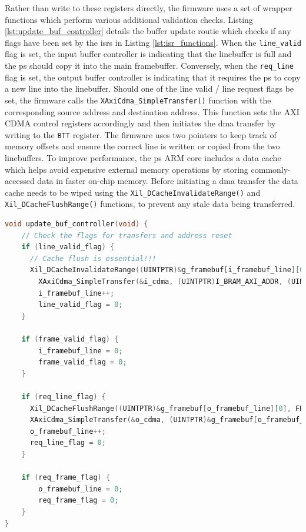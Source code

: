 Rather than write to these registers directly, the firmware uses a set of wrapper functions which perform various additional validation checks. Listing \ref{lst:update_buf_controller} details the buffer update routie which checks if any flags have been set by the \glspl{isr} in Listing \ref{lst:isr_functions}. When the \texttt{line\_valid} flag is set, the input buffer controller is indicating that the linebuffer is full and the \gls{ps} should copy it into the main framebuffer. Conversely, when the \texttt{req\_line} flag is set, the output buffer controller is indicating that it requires the \gls{ps} to copy a new line into the linebuffer. Should one of the line valid / line request flags be set, the firmware calls the \texttt{XAxiCdma\_SimpleTransfer()} function with the corresponding source address and destination address. This function sets the AXI CDMA control registers accordingly and then initiates the \gls{dma} transfer by writing to the \texttt{BTT} register. The firmware uses two pointers to keep track of memory offsets and ensure the correct line is written or copied from the two linebuffers. To improve performance, the \gls{ps} ARM core includes a data cache which helps avoid expensive external memory operations by storing commonly-accessed data in faster on-chip memory. Before initiating a \gls{dma} transfer the data cache needs to be wiped using the \texttt{Xil\_DCacheInvalidateRange()} and \texttt{Xil\_DCacheFlushRange()} functions, to prevent any stale data being transferred.

\begin{lstlisting}[caption={Buffer controller update loop}, label={lst:update_buf_controller}, language=C]
void update_buf_controller(void) {
    // Check the flags for transfers and address reset
    if (line_valid_flag) {
      // Cache flush is essential!!!
      Xil_DCacheInvalidateRange((UINTPTR)&g_framebuf[i_framebuf_line][0], FRAMEBUF_WIDTH);
        XAxiCdma_SimpleTransfer(&i_cdma, (UINTPTR)I_BRAM_AXI_ADDR, (UINTPTR)&g_framebuf[i_framebuf_line][0], FRAMEBUF_WIDTH, NULL, NULL);
        i_framebuf_line++;
        line_valid_flag = 0;
    }

    if (frame_valid_flag) {
        i_framebuf_line = 0;
        frame_valid_flag = 0;
    }

    if (req_line_flag) {
      Xil_DCacheFlushRange((UINTPTR)&g_framebuf[o_framebuf_line][0], FRAMEBUF_WIDTH);
      XAxiCdma_SimpleTransfer(&o_cdma, (UINTPTR)&g_framebuf[o_framebuf_line][0], (UINTPTR)O_BRAM_AXI_ADDR, FRAMEBUF_WIDTH, NULL, NULL);
      o_framebuf_line++;
      req_line_flag = 0;
    }

    if (req_frame_flag) {
        o_framebuf_line = 0;
        req_frame_flag = 0;
    }
} 
\end{lstlisting}

